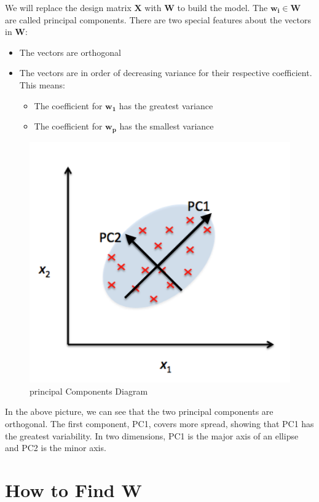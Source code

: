 \documentclass{article}
\begin{document}
\noindent We will replace the design matrix $\boldsymbol{X}$ with $\boldsymbol{W}$ to build the model. The $\boldsymbol{w_i} \in \boldsymbol{W}$ are called principal components. There are two special features about the vectors in $\boldsymbol{W}$:
\begin{itemize}
    \item The vectors are orthogonal
    \item The vectors are in order of decreasing variance for their respective coefficient. This means: 
    \begin{itemize}
        \item The coefficient for $\boldsymbol{w_1}$ has the greatest variance 
        \item The coefficient for $\boldsymbol{w_p}$ has the smallest variance
    \end{itemize}
\end{itemize}

\begin{figure}[hbtp]
        \centering
        \includegraphics[width=4.5in]{pca.png}
        \caption{principal Components Diagram}
        \label{Newton Raphson}
    \end{figure}

\noindent In the above picture, we can see that the two principal components are orthogonal. The first component, PC1, covers more spread, showing that PC1 has the greatest variability. In two dimensions, PC1 is the major axis of an ellipse and PC2 is the minor axis.

\section{How to Find $\boldsymbol{W}$}
\end{document}
